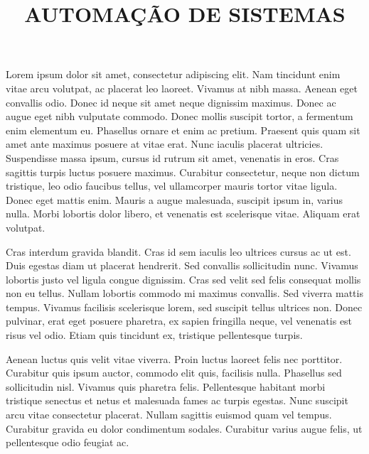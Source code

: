 \documentclass[a4paper]{article}
\title{AUTOMAÇÃO DE SISTEMAS}
\begin{document}
    \header{}
    
    \begin{answer}
        Lorem ipsum dolor sit amet, consectetur adipiscing elit. Nam tincidunt enim vitae arcu volutpat, ac placerat leo laoreet. Vivamus at nibh massa. Aenean eget convallis odio. Donec id neque sit amet neque dignissim maximus. Donec ac augue eget nibh vulputate commodo. Donec mollis suscipit tortor, a fermentum enim elementum eu. Phasellus ornare et enim ac pretium. Praesent quis quam sit amet ante maximus posuere at vitae erat. Nunc iaculis placerat ultricies. Suspendisse massa ipsum, cursus id rutrum sit amet, venenatis in eros. Cras sagittis turpis luctus posuere maximus. Curabitur consectetur, neque non dictum tristique, leo odio faucibus tellus, vel ullamcorper mauris tortor vitae ligula. Donec eget mattis enim. Mauris a augue malesuada, suscipit ipsum in, varius nulla. Morbi lobortis dolor libero, et venenatis est scelerisque vitae. Aliquam erat volutpat.

        Cras interdum gravida blandit. Cras id sem iaculis leo ultrices cursus ac ut est. Duis egestas diam ut placerat hendrerit. Sed convallis sollicitudin nunc. Vivamus lobortis justo vel ligula congue dignissim. Cras sed velit sed felis consequat mollis non eu tellus. Nullam lobortis commodo mi maximus convallis. Sed viverra mattis tempus. Vivamus facilisis scelerisque lorem, sed suscipit tellus ultrices non. Donec pulvinar, erat eget posuere pharetra, ex sapien fringilla neque, vel venenatis est risus vel odio. Etiam quis tincidunt ex, tristique pellentesque turpis.

        Aenean luctus quis velit vitae viverra. Proin luctus laoreet felis nec porttitor. Curabitur quis ipsum auctor, commodo elit quis, facilisis nulla. Phasellus sed sollicitudin nisl. Vivamus quis pharetra felis. Pellentesque habitant morbi tristique senectus et netus et malesuada fames ac turpis egestas. Nunc suscipit arcu vitae consectetur placerat. Nullam sagittis euismod quam vel tempus. Curabitur gravida eu dolor condimentum sodales. Curabitur varius augue felis, ut pellentesque odio feugiat ac.
    \end{answer}
    
\end{document}
